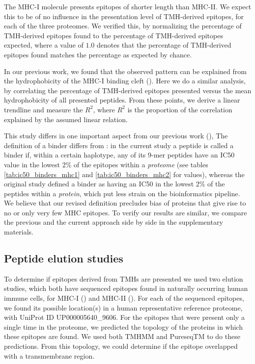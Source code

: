 The MHC-I molecule presents epitopes of shorter length than MHC-II.
We expect this to be of no influence in the presentation level
of TMH-derived epitopes, for each of the three proteomes.
We verified this, by normalizing the percentage of TMH-derived epitopes found
to the percentage of TMH-derived epitopes expected, 
where a value of $1.0$ denotes that the percentage of TMH-derived epitopes found
matches the percentage as expected by chance.

In our previous work, we found that the observed pattern can be
explained from the hydrophobicity of the MHC-I binding cleft (\cite{bianchi2017}).
Here we do a similar analysis, by correlating the percentage of TMH-derived
epitopes presented versus the mean hydrophobicity of all presented
peptides. From these points, we derive a linear trendline and measure
the $R^2$, where $R^2$ is the proportion of the correlation explained by
the assumed linear relation.

This study differs in one important aspect from our previous work (\cite{bianchi2017}), 
The definition of a binder differs from \cite{bianchi2017}:
in the current study a peptide is called a binder if, within a certain haplotype, 
any of its 9-mer peptides have an IC50 value in the lowest 2\% of 
the epitopes within a 
\emph{proteome} (see tables \ref{tab:ic50_binders_mhc1} and \ref{tab:ic50_binders_mhc2}
for values), whereas the original study defined
a binder as having an IC50 in the lowest 2\% 
of the peptides within a \emph{protein}, 
which put less strain on the bioinformatics pipeline.
We believe that our revised definition precludes bias of proteins 
that give rise to no or only very few MHC epitopes.
To verify our results are similar,
we compare the previous and the
current approach side by side in the supplementary materials.

\subsection{Peptide elution studies}\label{subsec:elution_studies}

To determine if epitopes derived from TMHs are presented 
we used two elution studies, which both have sequenced
epitopes found in naturally occurring human immune cells,
for MHC-I (\cite{schellens2015comprehensive}) 
and MHC-II (\cite{bergseng2015different}).
For each of the sequenced epitopes,
we found its possible location(s) in 
a human representative reference proteome,
with UniProt ID UP000005640\_9606.
For the epitopes that were present only a single time in the proteome,
we predicted the topology of the proteins in which these epitopes are found.
We used both TMHMM and PureseqTM to do these predictions. 
From this topology, we could determine if the epitope
overlapped with a transmembrane region.

